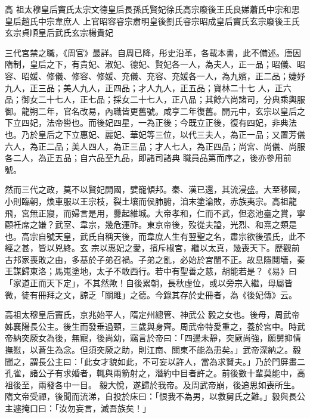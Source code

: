 
\begin{pinyinscope}

 高
 祖太穆皇后竇氏太宗文德皇后長孫氏賢妃徐氏高宗廢後王氏良娣蕭氏中宗和思皇后趙氏中宗韋庶人
 上官昭容睿宗肅明皇後劉氏睿宗昭成皇后竇氏玄宗廢後王氏玄宗貞順皇后武氏玄宗楊貴妃



 三代宮禁之職，《周官》最詳。自周已降，彤史沿革，各載本書，此不備述。唐因隋制，皇后之下，有貴妃、淑妃、德妃、賢妃各一人，為夫人，正一品；昭儀、昭容、昭媛、修儀、修容、修媛、充儀、充容、充媛各一人，為九嬪，正二品；婕妤九人，正三品；美人九人，正四品；才人九人，正五品；寶林二十七
 人，正六品；御女二十七人，正七品；採女二十七人，正八品；其餘六尚諸司，分典乘輿服御。龍朔二年，官名改易，內職皆更舊號。咸亨二年復舊。開元中，玄宗以皇后之下立四妃，法帝嚳也。而後妃四星，一為正後；今既立正後，復有四妃，非典法也。乃於皇后之下立惠妃、麗妃、華妃等三位，以代三夫人，為正一品；又置芳儀六人，為正二品；美人四人，為正三品；才人七人，為正四品；尚宮、尚儀、尚服各二人，為正五品；自六品至九品，即諸司諸典
 職員品第而序之，後亦參用前號。



 然而三代之政，莫不以賢妃開國，嬖寵傾邦。秦、漢已還，其流浸盛。大至移國，小則臨朝，煥車服以王宗枝，裂土壤而侯肺腑，洎末塗淪敗，赤族夷宗。高祖龍飛，宮無正寢，而婦言是用，釁起維城。大帝孝和，仁而不武，但恣池臺之賞，寧顧衽席之嫌？武室、韋宗，幾危運祚。東京帝後，歿從夫謚，光烈、和熹之類是也。高宗自號天皇，武氏自稱天後，而韋庶人生有翌聖之名，肅宗欲後張氏，此不經之甚，皆以兇終。玄
 宗以惠妃之愛，擯斥椒宮，繼以太真，幾喪天下。歷觀前古邦家喪敗之由，多基於子弟召禍。子弟之亂，必始於宮闈不正。故息隱鬩墻，秦王謀歸東洛；馬嵬塗地，太子不敢西行。若中有聖善之慈，胡能若是？《易》曰「家道正而天下定」，不其然歟！自後累朝，長秋虛位，或以旁宗入繼，母屬皆微，徒有冊拜之文，諒乏「關雎」之德。今錄其存於史冊者，為《後妃傳》云。



 高祖太穆皇后竇氏，京兆始平人，隋定州總管、神武公
 毅之女也。後母，周武帝姊襄陽長公主。後生而發垂過頸，三歲與身齊。周武帝特愛重之，養於宮中。時武帝納突厥女為後，無寵，後尚幼，竊言於帝曰：「四邊未靜，突厥尚強，願舅抑情撫慰，以蒼生為念。但須突厥之助，則江南、關東不能為患矣。」武帝深納之。毅聞之，謂長公主曰：「此女才貌如此，不可妄以許人，當為求賢夫。」乃於門屏畫二孔雀，諸公子有求婚者，輒與兩箭射之，潛約中目者許之。前後數十輩莫能中，高祖後至，兩發各中一目。
 毅大悅，遂歸於我帝。及周武帝崩，後追思如喪所生。隋文帝受禪，後聞而流涕，自投於床曰：「恨我不為男，以救舅氏之難。」毅與長公主遽掩口曰：「汝勿妄言，滅吾族矣！」




\end{pinyinscope}
